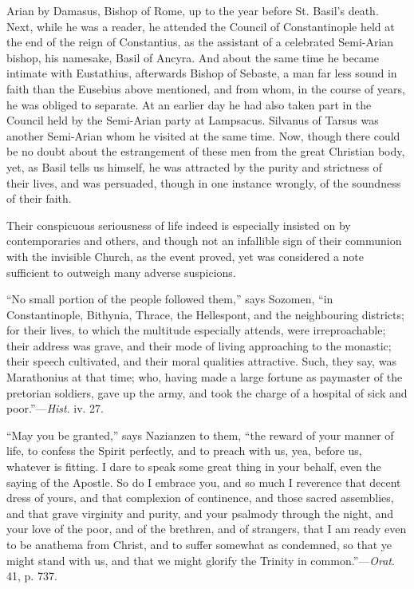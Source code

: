 Arian by Damasus, Bishop of Rome, up to the year before St. Basil's
death. Next, while he was a reader, he attended the Council of
Constantinople held at the end of the reign of Constantius, as the
assistant of a celebrated Semi-Arian bishop, his namesake, Basil of
Ancyra. And about the same time he became intimate with Eustathius,
afterwards Bishop of Sebaste, a man far less sound in faith than the
Eusebius above mentioned, and from whom, in the course of years, he
was obliged to separate. At an earlier day he had also taken part in
the Council held by the Semi-Arian party at Lampsacus. Silvanus of
Tarsus was another Semi-Arian whom he visited at the same time. Now,
though there could be no doubt about the estrangement of these men
from the great Christian body, yet, as Basil tells us himself, he was
attracted by the purity and strictness of their lives, and was
persuaded, though in one instance wrongly, of the soundness of their
faith.

Their conspicuous seriousness of life indeed is
especially insisted on by contemporaries and others, and though not an
infallible sign of their communion with the invisible Church, as the
event proved, yet was considered a note sufficient to outweigh many
adverse suspicions.

``No small
portion of the people followed them,'' says Sozomen, ``in
Constantinople, Bithynia, Thrace, the Hellespont, and the neighbouring
districts; for their lives, to which the multitude especially attends,
were irreproachable; their address was grave, and their mode of living
approaching to the monastic; their speech cultivated, and their moral
qualities attractive. Such, they say, was Marathonius at that time;
who, having made a large fortune as paymaster of the pretorian
soldiers, gave up the army, and took the charge of a hospital of sick
and poor.''—\emph{Hist}. iv. 27.

``May you be
granted,'' says Nazianzen to them, ``the reward of your manner of
life, to confess the Spirit perfectly, and to preach with us, yea,
before us, whatever is fitting. I dare to speak some great thing in
your behalf, even the saying of the Apostle. So do I embrace you, and
so much I reverence that decent dress of yours, and that complexion of
continence, and those sacred assemblies, and that grave virginity and
purity, and your psalmody through the night, and your love of the
poor, and of the brethren, and of strangers, that I am ready even to
be anathema from Christ, and to suffer somewhat as condemned, so that
ye might stand with us, and that we might glorify the Trinity in
common.''—\emph{Orat}. 41, p. 737.


